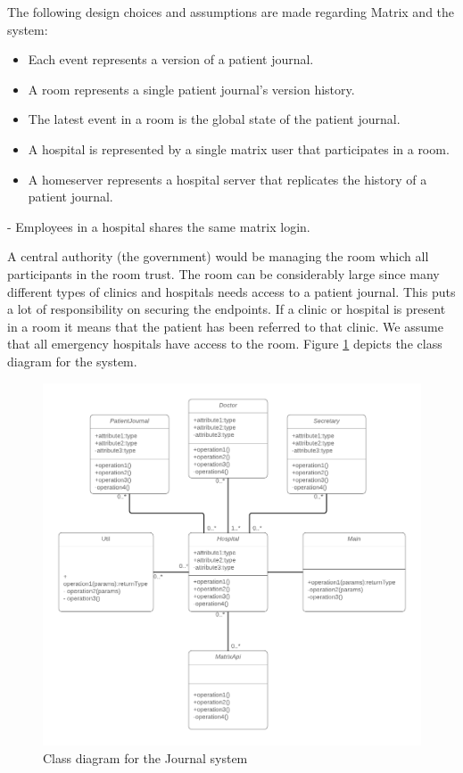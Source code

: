 The following design choices and assumptions are made regarding Matrix and the system: 

\begin{itemize}
	\item Each event represents a version of a patient journal.
	\item A room represents a single patient journal's version history. 
	\item The latest event in a room is the global state of the patient journal.
	\item A hospital is represented by a single matrix user that participates in a room.
	\item A homeserver represents a hospital server that replicates the history of a patient journal. 
\end{itemize}


- Employees in a hospital shares the same matrix login.

A central authority (the government) would be managing the room which all participants in the room trust. The room can be considerably large since many different types of clinics and hospitals needs access to a patient journal. This puts a lot of responsibility on securing the endpoints. If a clinic or hospital is present in a room it means that the patient has been referred to that clinic. We assume that all emergency hospitals have access to the room.
Figure \ref{fig:journalsystem} depicts the class diagram for the system.

\begin{figure}[H] 
	\hspace*{-1cm}
	\centering
	\includegraphics[width=12cm]{figures/journalsystem_class.png}
	\caption{Class diagram for the Journal system}
	\label{fig:journalsystem}
\end{figure}



